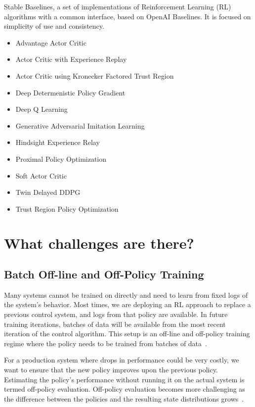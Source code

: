 \documentclass[letterpaper, 10 pt]{IEEEconf}
\begin{document}
Stable Baselines, a set of implementations of
Reinforcement Learning (RL) algorithms with a common interface, based
on OpenAI Baselines. It is focused on simplicity of use and
consistency.

\begin{itemize}
	\item Advantage Actor Critic
	\item Actor Critic with Experience Replay
	\item Actor Critic using Kronecker Factored Trust Region
	\item Deep Determenistic Policy Gradient
	\item Deep Q Learning
	\item Generative Adversarial Imitation Learning
	\item Hindsight Experience Relay
	\item Proximal Policy Optimization
	\item Soft Actor Critic
	\item Twin Delayed DDPG
	\item Trust Region Policy Optimization
\end{itemize}

\section{What challenges are there?}

\subsection{Batch Off-line and Off-Policy Training}

Many systems cannot be trained on directly and need to learn from
fixed logs of the system’s behavior. Most times, we are deploying an
RL approach to replace a previous control system, and logs from that
policy are available. In future training iterations, batches of data
will be available from the most recent iteration of the control
algorithm. This setup is an off-line and off-policy training regime
where the policy needs to be trained from batches of data~\cite{deepmind2019}.

For a production system where drops in performance could be very
costly, we want to ensure that the new policy improves upon the
previous policy. Estimating the policy’s performance without running
it on the actual system is termed off-policy evaluation. Off-policy
evaluation becomes more challenging as the difference between the
policies and the resulting state distributions grows~\cite{deepmind2019}.
\end{document}
